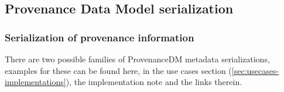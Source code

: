 
\subsection{Provenance Data Model serialization}\label{sec:serialisations}


\subsubsection{Serialization of provenance information}

There are two possible families of ProvenanceDM metadata serializations, examples for these can be found here, in the use cases section (\ref{sec:usecases-implementations}), the implementation note \citep[]{std:ProvenanceImplementationNote} and the links therein.

